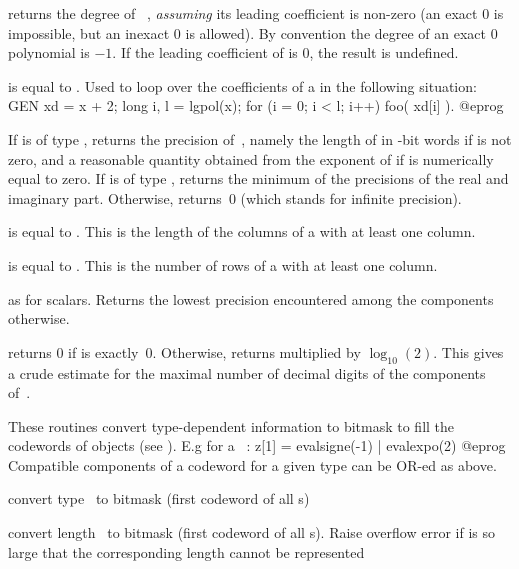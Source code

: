  returns the degree of ~,
\emph{assuming} its leading coefficient is non-zero (an exact $0$ is
impossible, but an inexact $0$ is allowed). By convention the degree of an
exact $0$ polynomial is $-1$. If the leading coefficient of  is $0$,
the result is undefined.

 is equal to . Used to loop over
the coefficients of a  in the following situation:
\bprog
    GEN xd = x + 2;
    long i, l = lgpol(x);
    for (i = 0; i < l; i++) foo( xd[i] ).
@eprog

 If  is of type , returns the
precision of~, namely the length of  in \B-bit words if 
is not zero, and a reasonable quantity obtained from the exponent of 
if  is numerically equal to zero. If  is of type
, returns the minimum of the precisions of the real and
imaginary part. Otherwise, returns~0 (which stands for infinite precision).

 is equal to . This is the length
of the columns of a  with at least one column.

 is equal to . This is the number
of rows of a  with at least one column.

 as  for scalars. Returns the
lowest precision encountered among the components otherwise.

 returns 0 if  is exactly~0. Otherwise,
returns  multiplied by $\log_{10}(2)$. This gives a crude
estimate for the maximal number of decimal digits of the components
of~.

These routines convert type-dependent information to bitmask to fill the
codewords of  objects (see ). E.g for a
~:
\bprog
  z[1] = evalsigne(-1) | evalexpo(2)
@eprog
Compatible components of a codeword for a given type can be OR-ed as above.

 convert type~ to bitmask (first
codeword of all s)

 convert length~ to bitmask (first
codeword of all s). Raise overflow error if  is so large that
the corresponding length cannot be represented

